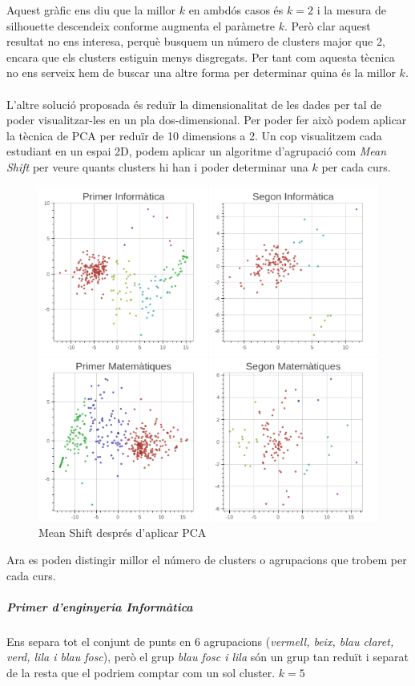 \documentclass[12pt,a4paper,catalan]{article}
\begin{document}
Aquest gràfic ens diu que la millor $k$ en ambdós casos és $k=2$ i la mesura de silhouette descendeix conforme augmenta el paràmetre $k$. Però clar aquest resultat no ens interesa, perquè busquem un número de clusters major que 2, encara que els clusters estiguin menys disgregats. Per tant com aquesta tècnica no ens serveix hem de buscar una altre forma per determinar quina és la millor $k$.
\\
\\
L'altre solució proposada és reduïr la dimensionalitat de les dades per tal de poder visualitzar-les en un pla dos-dimensional. Per poder fer això podem aplicar la tècnica de PCA per reduïr de 10 dimensions a 2. Un cop visualitzem cada estudiant en un espai 2D, podem aplicar un algoritme d'agrupació com \textit{Mean Shift} per veure quants clusters hi han i poder determinar una $k$ per cada curs.

\begin{figure}[h]
\centering
\includegraphics[width=\linewidth]{img/pca_info_mates.png}
\caption{Mean Shift després d'aplicar PCA}
\end{figure}

\newpage

Ara es poden distingir millor el número de clusters o agrupacions que trobem per cada curs.

\subparagraph{Primer d'enginyeria Informàtica}
Ens separa tot el conjunt de punts en 6 agrupacions (\textit{vermell, beix, blau claret, verd, lila i blau fosc}), però el grup \textit{blau fosc i lila} són un grup tan reduït i separat de la resta que el podriem comptar com un sol cluster. $k=5$
\end{document}
